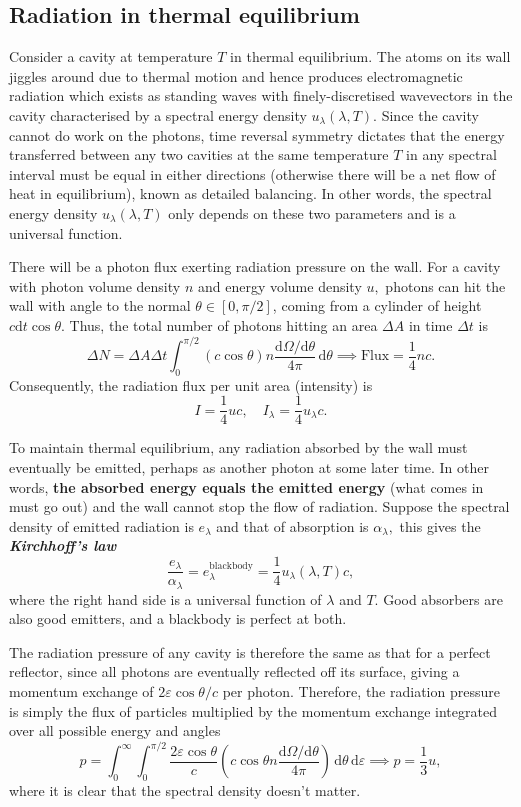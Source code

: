 \documentclass{article}
\theoremstyle{nonumberplain}
\begin{document}
\subsection{Radiation in thermal equilibrium}
\label{subsec:blackbody-radiation}
Consider a cavity at temperature $T$ in thermal equilibrium. The atoms on its wall jiggles around due to thermal motion and hence produces electromagnetic radiation which exists as standing waves with finely-discretised wavevectors in the cavity characterised by a spectral energy density $u_\lambda (\lambda , T).$ Since the cavity cannot do work on the photons, time reversal symmetry dictates that the energy transferred between any two cavities at the same temperature $T$ in any spectral interval must be equal in either directions (otherwise there will be a net flow of heat in equilibrium), known as detailed balancing. In other words, the spectral energy density $u_\lambda(\lambda, T)$ only depends on these two parameters and is a universal function. 

There will be a photon flux exerting radiation pressure on the wall. For a cavity with photon volume density $n$ and energy volume density $u,$ photons can hit the wall with angle to the normal $\theta \in [0, \pi / 2]$, coming from a cylinder of height $c \mathrm{d} t \cos{\theta}.$ Thus, the total number of photons hitting an area $\Delta A$ in time $\Delta  t$ is 
\[
    \Delta N = \Delta A \Delta t \int_{0}^{\pi /2 } (c \cos \theta) n \frac{\mathrm{d} \Omega / \mathrm{d} \theta }{4\pi }\,\mathrm{d}\theta   \implies \boxed{\mathrm{Flux} = \frac{1}{4} n c }. 
\]
Consequently, the radiation flux per unit area (intensity) is 
\[
    I = \frac{1}{4} u c, \quad I_{\lambda} = \frac{1}{4} u_\lambda c.
\]

To maintain thermal equilibrium, any radiation absorbed by the wall must eventually be emitted, perhaps as another photon at some later time. In other words, \textbf{the absorbed energy equals the emitted energy} (what comes in must go out) and the wall cannot stop the flow of radiation. Suppose the spectral density of emitted radiation is $e_\lambda$ and that of absorption is $\alpha_\lambda,$ this gives the \textit{\textbf{Kirchhoff's law}} 
\[
    \boxed{
        \frac{e_\lambda }{\alpha_\lambda} = e^{\mathrm{blackbody} }_{\lambda} = \frac{1}{4}u_\lambda(\lambda, T) c, 
    }
\]
where the right hand side is a universal function of $\lambda$ and $T.$ Good absorbers are also good emitters, and a blackbody is perfect at both. 

The radiation pressure of any cavity is therefore the same as that for a perfect reflector, since all photons are eventually reflected off its surface, giving a momentum exchange of $2 \varepsilon \cos{\theta} / c$ per photon. Therefore, the radiation pressure is simply the flux of particles multiplied by the momentum exchange integrated over all possible energy and angles
\[
    p = \int_{0}^{\infty} \int_{0}^{\pi/2}  \frac{2 \varepsilon \cos{\theta}}{c}  \left( c \cos \theta n \frac{\mathrm{d} \Omega / \mathrm{d} \theta }{4\pi } \right) \,\mathrm{d}\theta   \,\mathrm{d}\varepsilon \implies \boxed{p = \frac{1}{3}u,}   
\]
where it is clear that the spectral density doesn't matter. 
\end{document}

